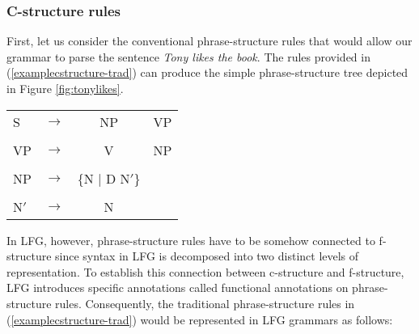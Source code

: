 \subsubsection{C-structure rules}

First, let us consider the conventional phrase-structure rules that would allow our grammar to parse the sentence \textit{Tony likes the book}. The rules provided in (\ref{examplecstructure-trad}) can produce the simple phrase-structure tree depicted in Figure \ref{fig:tonylikes}.

\pex
\vspace{-12pt}
\label{examplecstructure-trad}

\begin{tabular}{lccc}
	S & $\longrightarrow$ & NP & VP \\
	& & & \\
	VP & $\longrightarrow$ & V & NP \\
	& & & \\
	NP & $\longrightarrow$ & \{N | D N$'$\} & \\
	& & & \\
	N$'$ & $\longrightarrow$ & N & \\
\end{tabular}
\xe

In LFG, however, phrase-structure rules have to be somehow connected to f-structure since syntax in LFG is decomposed into two distinct levels of representation. To establish this connection between c-structure and f-structure, LFG introduces specific annotations called functional annotations on phrase-structure rules. Consequently, the traditional phrase-structure rules in (\ref{examplecstructure-trad}) would be represented in LFG grammars as follows:

\pex
\vspace{-12pt}
\label{examplecstructure}

